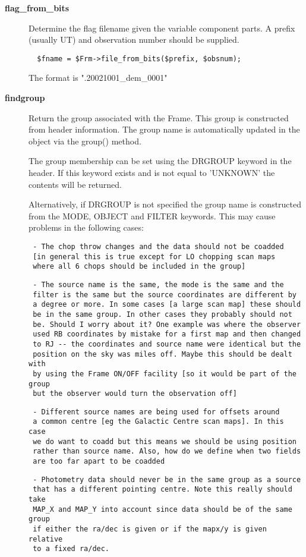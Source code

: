 \begin{description}
\begin{description}
\item[{\textbf{flag\_from\_bits}}] \mbox{}

Determine the flag filename given the variable component
parts. A prefix (usually UT) and observation number should
be supplied.

\begin{verbatim}
  $fname = $Frm->file_from_bits($prefix, $obsnum);
\end{verbatim}


The format is ".20021001\_dem\_0001"


\item[{\textbf{findgroup}}] \mbox{}

Return the group associated with the Frame. This group is constructed
from header information. The group name is automatically updated in
the object via the group() method.



The group membership can be set using the DRGROUP keyword in the
header. If this keyword exists and is not equal to 'UNKNOWN' the
contents will be returned.



Alternatively, if DRGROUP is not specified the group name is
constructed from the MODE, OBJECT and FILTER keywords. This may cause
problems in the following cases:

\begin{verbatim}
 - The chop throw changes and the data should not be coadded
 [in general this is true except for LO chopping scan maps
 where all 6 chops should be included in the group]
\end{verbatim}
\begin{verbatim}
 - The source name is the same, the mode is the same and the
 filter is the same but the source coordinates are different by
 a degree or more. In some cases [a large scan map] these should
 be in the same group. In other cases they probably should not
 be. Should I worry about it? One example was where the observer
 used RB coordinates by mistake for a first map and then changed
 to RJ -- the coordinates and source name were identical but the
 position on the sky was miles off. Maybe this should be dealt with
 by using the Frame ON/OFF facility [so it would be part of the group
 but the observer would turn the observation off]
\end{verbatim}
\begin{verbatim}
 - Different source names are being used for offsets around
 a common centre [eg the Galactic Centre scan maps]. In this case
 we do want to coadd but this means we should be using position
 rather than source name. Also, how do we define when two fields
 are too far apart to be coadded
\end{verbatim}
\begin{verbatim}
 - Photometry data should never be in the same group as a source
 that has a different pointing centre. Note this really should take
 MAP_X and MAP_Y into account since data should be of the same group
 if either the ra/dec is given or if the mapx/y is given relative
 to a fixed ra/dec.
\end{verbatim}



\end{description}
\end{description}
